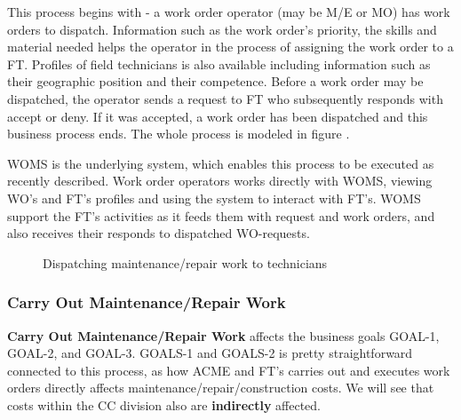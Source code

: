 This process begins with - a work order operator (may be M/E or MO) has work orders to dispatch. Information such as the work order's priority, the skills and material needed helps the operator in the process of assigning the work order to a FT. Profiles of field technicians is also available including information such as their geographic position and their competence. Before a work order may be dispatched, the operator sends a request to FT who subsequently responds with accept or deny. If it was accepted, a work order has been dispatched and this business process ends. The whole process is modeled in figure .

WOMS is the underlying system, which enables this process to be executed as recently described. Work order operators works directly with WOMS, viewing WO's and FT's profiles and using the system to interact with FT's. WOMS support the FT's activities as it feeds them with request and work orders, and also receives their responds to dispatched WO-requests.
\begin{figure}[H]
	\centering
	\setlength\fboxsep{7pt}
	\setlength\fboxrule{0.5pt}
	\label{fig:dispatch}
	\caption{Dispatching maintenance/repair work to technicians}
\end{figure}
%
\subsubsection{Carry Out Maintenance/Repair Work}
\label{sec:bp4}
\textbf{Carry Out Maintenance/Repair Work} affects the business goals GOAL-1, GOAL-2, and GOAL-3. GOALS-1 and GOALS-2 is pretty straightforward connected to this process, as how ACME and FT's carries out and executes work orders directly affects maintenance/repair/construction costs. We will see that costs within the CC division also are \textbf{indirectly} affected.

